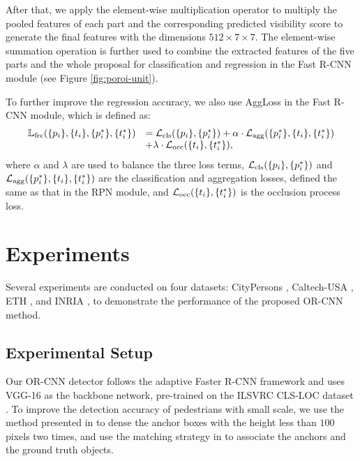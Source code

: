 \documentclass[runningheads]{llncs}
\begin{document}
After that, we apply the element-wise multiplication operator to multiply the pooled features of each part and the corresponding predicted visibility score to generate the final features with the dimensions $512\times7\times7$. The element-wise summation operation is further used to combine the extracted features of the five parts and the whole proposal for classification and regression in the Fast R-CNN module (see Figure \ref{fig:poroi-unit}).

To further improve the regression accuracy, we also use AggLoss in the Fast R-CNN module, which is defined as:
\begin{equation}
\begin{array}{ll}
\mathbb{L}_{\text{frc}}(\{ p_i \}, \{ t_i \}, \{ p_i^\ast \}, \{ t_i^\ast \}) &=  {\cal L}_{\text{cls}}(\{p_i\}, \{p_i^\ast\}) + \alpha \cdot {\cal L}_{\text{agg}}(\{ p_i^\ast \}, \{ t_i \}, \{ t_i^\ast \}) \\
&+ \lambda \cdot {\cal L}_{\text{occ}}(\{ t_i \}, \{ t_i^\ast \}),
\end{array}
\end{equation}
where $\alpha$ and $\lambda$ are used to balance the three loss terms, ${\cal L}_{\text{cls}}(\{p_i\}, \{p_i^\ast\})$ and ${\cal L}_{\text{agg}}(\{ p_i^\ast \}, \{ t_i \}, \{ t_i^\ast \})$ are the classification and aggregation losses, defined the same as that in the RPN module, and ${\cal L}_{\text{occ}}(\{ t_i \}, \{ t_i^\ast \})$ is the occlusion process loss.

\section{Experiments}
Several experiments are conducted on four datasets: CityPersons \cite{DBLP:conf/cvpr/ZhangBS17}, Caltech-USA \cite{DBLP:journals/pami/DollarWSP12}, ETH \cite{DBLP:conf/iccv/EssLG07}, and INRIA \cite{DBLP:conf/cvpr/DalalT05}, to demonstrate the performance of the proposed OR-CNN method.

\subsection{Experimental Setup}
\label{subsec:imp-details}
Our OR-CNN detector follows the adaptive Faster R-CNN framework \cite{DBLP:conf/cvpr/ZhangBS17} and uses VGG-16 \cite{DBLP:journals/corr/SimonyanZ14a} as the backbone network, pre-trained on the ILSVRC CLS-LOC dataset \cite{DBLP:conf/nips/KrizhevskySH12}. To improve the detection accuracy of pedestrians with small scale, we use the method presented in \cite{DBLP:conf/ijcb/abs-1708-05234,DBLP:conf/ccbr/ZhangZLSWL17} to dense the anchor boxes with the height less than $100$ pixels two times, and use the matching strategy in \cite{DBLP:conf/iccv/abs-1708-05237} to associate the anchors and the ground truth objects.
\end{document}
